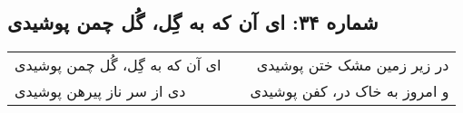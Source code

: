 \begin{center}
\section*{شماره ۳۴: ای آن که به گِل، گُل چمن پوشیدی}
\label{sec:034}
\begin{longtable}{l p{0.5cm} r}
ای آن که به گِل، گُل چمن پوشیدی
&&
در زیر زمین مشک ختن پوشیدی
\\
دی از سر ناز پیرهن پوشیدی
&&
و امروز به خاک در، کفن پوشیدی
\\
\end{longtable}
\end{center}
